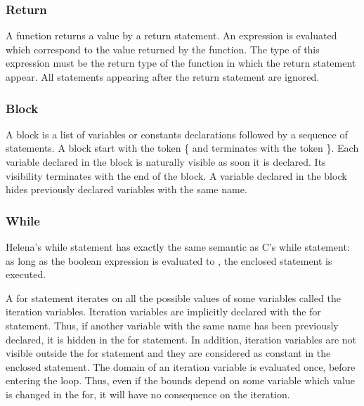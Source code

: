 \casedef


\subsubsection{Return}
A function returns a value by a return statement.  An expression is
evaluated which correspond to the value returned by the function.  The
type of this expression must be the return type of the function in
which the return statement appear.  All statements appearing after the
return statement are ignored.\\

\returndef


\subsubsection{Block}
A block is a list of variables or constants declarations followed by a
sequence of statements.  A block start with the token \{ and
terminates with the token \}.  Each variable declared in the block is
naturally visible as soon it is declared.  Its visibility terminates
with the end of the block.  A variable declared in the block hides
previously declared variables with the same name.\\

\blockdef


\subsubsection{While}
Helena's while statement has exactly the same semantic as C's while
statement: as long as the boolean expression is evaluated to
, the enclosed statement is executed.\\

\whiledef


A for statement iterates on all the possible values of some variables
called the iteration variables.  Iteration variables are implicitly
declared with the for statement.  Thus, if another variable with the
same name has been previously declared, it is hidden in the for
statement.  In addition, iteration variables are not visible outside
the for statement and they are considered as constant in the enclosed
statement.  The domain of an iteration variable is evaluated once,
before entering the loop.  Thus, even if the bounds depend on some
variable which value is changed in the for, it will have no
consequence on the iteration.

